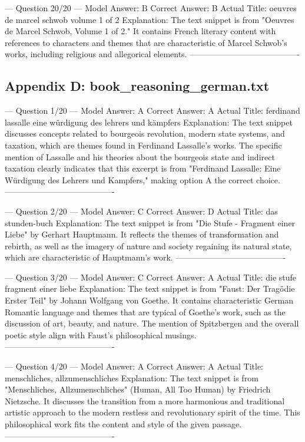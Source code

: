 \documentclass[11pt]{article}
\begin{document}
{--- Question 20/20 ---
Model Answer:    B
Correct Answer:  B
Actual Title:    oeuvres de marcel schwob volume 1 of 2
Explanation:     The text snippet is from "Oeuvres de Marcel Schwob, Volume 1 of 2." It contains French literary content with references to characters and themes that are characteristic of Marcel Schwob's works, including religious and allegorical elements.
----------------------------------------

\subsection{Appendix D: book\_reasoning\_german.txt}
--- Question 1/20 ---
Model Answer:    A
Correct Answer:  A
Actual Title:    ferdinand lassalle eine würdigung des lehrers und kämpfers
Explanation:     The text snippet discusses concepts related to bourgeois revolution, modern state systems, and taxation, which are themes found in Ferdinand Lassalle's works. The specific mention of Lassalle and his theories about the bourgeois state and indirect taxation clearly indicates that this excerpt is from "Ferdinand Lassalle: Eine Würdigung des Lehrers und Kampfers," making option A the correct choice.
----------------------------------------

--- Question 2/20 ---
Model Answer:    C
Correct Answer:  D
Actual Title:    das stunden-buch
Explanation:     The text snippet is from "Die Stufe - Fragment einer Liebe" by Gerhart Hauptmann. It reflects the themes of transformation and rebirth, as well as the imagery of nature and society regaining its natural state, which are characteristic of Hauptmann's work.
----------------------------------------

--- Question 3/20 ---
Model Answer:    C
Correct Answer:  A
Actual Title:    die stufe fragment einer liebe
Explanation:     The text snippet is from "Faust: Der Tragödie Erster Teil" by Johann Wolfgang von Goethe. It contains characteristic German Romantic language and themes that are typical of Goethe's work, such as the discussion of art, beauty, and nature. The mention of Spitzbergen and the overall poetic style align with Faust's philosophical musings.
----------------------------------------

--- Question 4/20 ---
Model Answer:    A
Correct Answer:  A
Actual Title:    menschliches, allzumenschliches
Explanation:     The text snippet is from "Menschliches, Allzumenschliches" (Human, All Too Human) by Friedrich Nietzsche. It discusses the transition from a more harmonious and traditional artistic approach to the modern restless and revolutionary spirit of the time. This philosophical work fits the content and style of the given passage.
----------------------------------------

}
\end{document}
